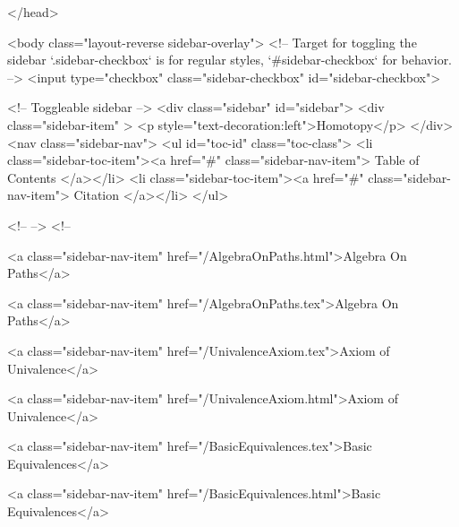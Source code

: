 </head>


  <body class="layout-reverse sidebar-overlay">
    <!-- Target for toggling the sidebar `.sidebar-checkbox` is for regular
     styles, `#sidebar-checkbox` for behavior. -->
<input type="checkbox" class="sidebar-checkbox" id="sidebar-checkbox">

<!-- Toggleable sidebar -->
<div class="sidebar" id="sidebar">
  <div class="sidebar-item" >
    <p style="text-decoration:left">Homotopy</p>
  </div>
  <nav class="sidebar-nav">
    <ul id="toc-id" class="toc-class">
  <li class="sidebar-toc-item"><a href="#" class="sidebar-nav-item"> Table of Contents </a></li>
  <li class="sidebar-toc-item"><a href="#" class="sidebar-nav-item"> Citation </a></li>
</ul>


    <!--  -->
    <!-- 
      
    
      
    
      
    
      
    
      
        
      
    
      
        
          <a class="sidebar-nav-item" href="/AlgebraOnPaths.html">Algebra On Paths</a>
        
      
    
      
        
          <a class="sidebar-nav-item" href="/AlgebraOnPaths.tex">Algebra On Paths</a>
        
      
    
      
        
          <a class="sidebar-nav-item" href="/UnivalenceAxiom.tex">Axiom of Univalence</a>
        
      
    
      
        
          <a class="sidebar-nav-item" href="/UnivalenceAxiom.html">Axiom of Univalence</a>
        
      
    
      
        
          <a class="sidebar-nav-item" href="/BasicEquivalences.tex">Basic Equivalences</a>
        
      
    
      
        
          <a class="sidebar-nav-item" href="/BasicEquivalences.html">Basic Equivalences</a>
        
      
    
